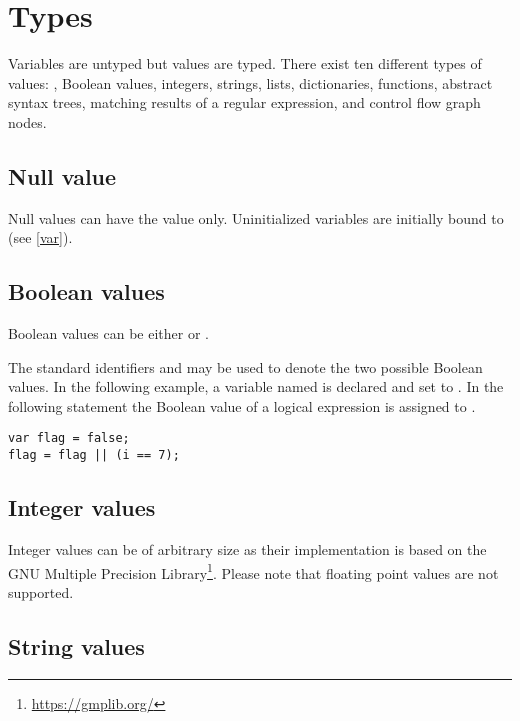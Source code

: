 \chapter{Types}

Variables are untyped but values are typed. There exist ten different
types of values: , Boolean values, integers, strings,
lists, dictionaries, functions, abstract syntax trees, matching
results of a regular expression, and control flow graph nodes.

\section{Null value}\label{null}

Null values can have the value  only.
Uninitialized variables are initially bound to 
(see \ref{var}).

\section{Boolean values}

Boolean values can be either  or .

The standard identifiers  and 
may be used to denote the two possible Boolean values. In
the following example, a variable named  is
declared and set to . In the following statement
the Boolean value of a logical expression is assigned to .

\begin{lstlisting}
var flag = false;
flag = flag || (i == 7);
\end{lstlisting}

\section{Integer values}\label{integer}

Integer values can be of arbitrary size as their
implementation is based on the GNU Multiple Precision
Library\footnote{\url{https://gmplib.org/}}. Please note that floating point values
are not supported.

\section{String values}\label{string}

